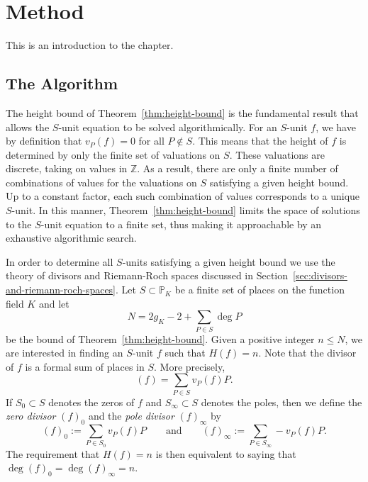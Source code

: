 
\chapter{Method}%
\label{chap:method}

This is an introduction to the chapter.

\section{The Algorithm}%
\label{sec:the-algorithm}

The height bound of Theorem~\ref{thm:height-bound} is the fundamental result that allows the \(S\)-unit equation to be solved algorithmically. For an \(S\)-unit \(f\), we have by definition that \(v_{P}(f) = 0\) for all \(P \notin S\). This means that the height of \(f\) is determined by only the finite set of valuations on \(S\). These valuations are discrete, taking on values in \(\mathbb{Z}\). As a result, there are only a finite number of combinations of values for the valuations on \(S\) satisfying a given height bound. Up to a constant factor, each such combination of values corresponds to a unique \(S\)-unit. In this manner, Theorem~\ref{thm:height-bound} limits the space of solutions to the \(S\)-unit equation to a finite set, thus making it approachable by an exhaustive algorithmic search.

In order to determine all \(S\)-units satisfying a given height bound we use the theory of divisors and Riemann-Roch spaces discussed in Section~\ref{sec:divisors-and-riemann-roch-spaces}. Let \(S \subset \mathbb{P}_{K}\) be a finite set of places on the function field \(K\) and let
\[N = 2g_{K} - 2 + \sum_{P \in S} \deg{P}\]
be the bound of Theorem~\ref{thm:height-bound}. Given a positive integer \(n \leq N\), we are interested in finding an \(S\)-unit \(f\) such that \(H(f) = n\). Note that the divisor of \(f\) is a formal sum of places in \(S\). More precisely,
\[(f) = \sum_{P \in S} v_{P}(f) P.\]
If \(S_{0} \subset S\) denotes the zeros of \(f\) and \(S_{\infty} \subset S\) denotes the poles, then we define the \textit{zero divisor} \({(f)}_{0}\) and the \textit{pole divisor} \({(f)}_{\infty}\) by
\[{(f)}_{0} := \sum_{P \in S_{0}} v_{P}(f) P \qquad \text{and} \qquad {(f)}_{\infty} := \sum_{P \in S_{\infty}} - v_{P}(f) P.\]
The requirement that \(H(f) = n\) is then equivalent to saying that \(\deg{{(f)}_{0}} = \deg{{(f)}_{\infty}} = n\).

